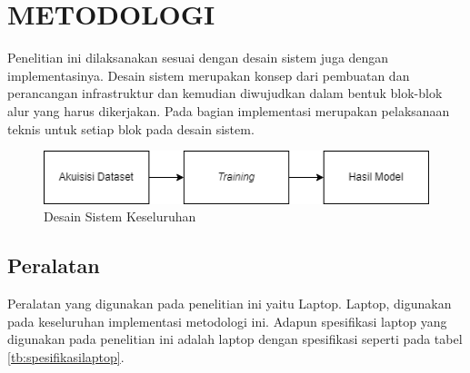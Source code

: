 
\chapter{METODOLOGI}
\label{chap:metodologi}


Penelitian ini dilaksanakan sesuai dengan desain sistem juga dengan implementasinya. Desain sistem merupakan konsep dari pembuatan dan perancangan infrastruktur dan kemudian diwujudkan dalam bentuk blok-blok alur yang harus dikerjakan. Pada bagian implementasi merupakan pelaksanaan teknis untuk setiap blok pada desain sistem.

\begin{figure}[H]
    \centering
    \includegraphics[scale=0.85]{gambar/metodologi_umum.png}
    \caption{Desain Sistem Keseluruhan}
    \label{fig:desainsistem}
\end{figure}

\section{Peralatan}
\label{sec:peralatan}
Peralatan yang digunakan pada penelitian ini yaitu Laptop. Laptop, digunakan pada keseluruhan implementasi metodologi ini. Adapun spesifikasi laptop yang digunakan pada penelitian ini adalah laptop dengan spesifikasi seperti pada tabel \ref{tb:spesifikasilaptop}.\par

